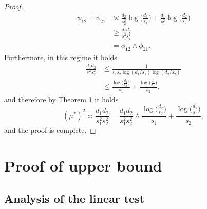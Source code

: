 \documentclass{article}
\theoremstyle{remark}
\begin{document}
\begin{proof}
    \begin{align}
        \psi_{12} + \psi_{21} &\asymp \frac{d_2}{s_2^2}\log\big(\frac{d_1}{s_1}\big) + \frac{d_1}{s_1^2}\log\big(\frac{d_2}{s_2}\big) \\
        &\geq \frac{d_1d_2}{s_1^2s_2^2} \\
        &= \phi_{12} \land \phi_{21}.
    \end{align}
    Furthermore, in this regime it holds
    \begin{align}
        \frac{d_1d_2}{s_1^2s_2^2} &\leq \frac{1}{s_1s_2\log(d_1/s_1)\log(d_2/s_2)} \\
        &\leq \frac{\log \big(\frac{d_2}{s_2}\big)}{s_1} + \frac{\log \big(\frac{d_1}{s_1}\big)}{s_2},
    \end{align}
    and therefore by Theorem 1 it holds
    \begin{equation}
        (\mu^{*})^2 \asymp \frac{d_1d_2}{s_1^2s_2^2} = \frac{d_1d_2}{s_1^2s_2^2} \land \frac{\log \big(\frac{d_2}{s_2}\big)}{s_1} + \frac{\log \big(\frac{d_1}{s_1}\big)}{s_2},
    \end{equation}
    and the proof is complete.
    \end{proof}
\section{Proof of upper bound}\label{app_ub}


\subsection{Analysis of the linear test}
\end{document}
